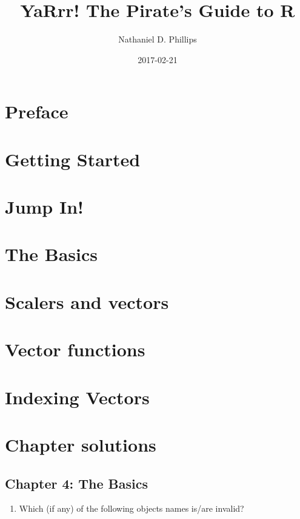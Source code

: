 \documentclass[]{book}
\title{YaRrr! The Pirate's Guide to R}
\author{Nathaniel D. Phillips}
\date{2017-02-21}
\providecommand{\tightlist}{%
  \setlength{\itemsep}{0pt}\setlength{\parskip}{0pt}}
\begin{document}
\maketitle

{
\setcounter{tocdepth}{1}
\tableofcontents
}
\chapter{Preface}\label{intro}

\chapter{Getting Started}\label{started}

\chapter{Jump In!}\label{jumpin}

\chapter{The Basics}\label{basics}

\chapter{Scalers and vectors}\label{scalersvectors}

\chapter{Vector functions}\label{vectorfunctions}

\chapter{Indexing Vectors}\label{vectorindexing}

\chapter{Chapter solutions}\label{chapter-solutions}

\section{Chapter 4: The Basics}\label{chapter-4-the-basics}

\begin{enumerate}
\def\labelenumi{\arabic{enumi}.}
\setcounter{enumi}{1}
\tightlist
\item
  Which (if any) of the following objects names is/are invalid?
\end{enumerate}
\end{document}
